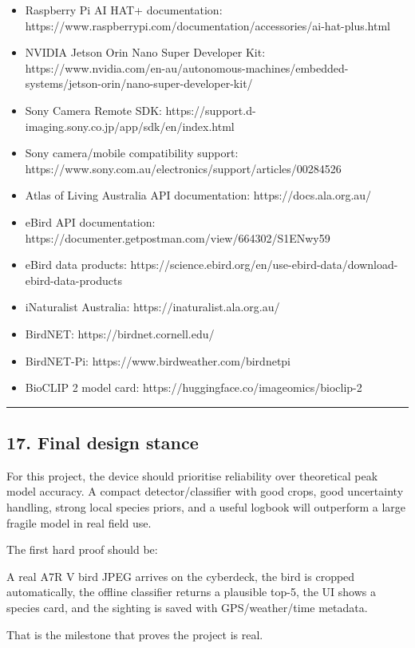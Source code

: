 \documentclass[
  11pt,
]{article}
\newenvironment{Shaded}{}{}
\newcommand{\NormalTok}[1]{#1}
\providecommand{\tightlist}{%
  \setlength{\itemsep}{0pt}\setlength{\parskip}{0pt}}
\begin{document}
\begin{itemize}
\tightlist
\item
  Raspberry Pi AI HAT+ documentation:
  https://www.raspberrypi.com/documentation/accessories/ai-hat-plus.html
\item
  NVIDIA Jetson Orin Nano Super Developer Kit:
  https://www.nvidia.com/en-au/autonomous-machines/embedded-systems/jetson-orin/nano-super-developer-kit/
\item
  Sony Camera Remote SDK:
  https://support.d-imaging.sony.co.jp/app/sdk/en/index.html
\item
  Sony camera/mobile compatibility support:
  https://www.sony.com.au/electronics/support/articles/00284526
\item
  Atlas of Living Australia API documentation: https://docs.ala.org.au/
\item
  eBird API documentation:
  https://documenter.getpostman.com/view/664302/S1ENwy59
\item
  eBird data products:
  https://science.ebird.org/en/use-ebird-data/download-ebird-data-products
\item
  iNaturalist Australia: https://inaturalist.ala.org.au/
\item
  BirdNET: https://birdnet.cornell.edu/
\item
  BirdNET-Pi: https://www.birdweather.com/birdnetpi
\item
  BioCLIP 2 model card: https://huggingface.co/imageomics/bioclip-2
\end{itemize}

\begin{center}\rule{0.5\linewidth}{0.5pt}\end{center}

\subsection{17. Final design stance}\label{final-design-stance}

For this project, the device should prioritise reliability over
theoretical peak model accuracy. A compact detector/classifier with good
crops, good uncertainty handling, strong local species priors, and a
useful logbook will outperform a large fragile model in real field use.

The first hard proof should be:

\begin{Shaded}
\begin{Highlighting}[]
\NormalTok{A real A7R V bird JPEG arrives on the cyberdeck,}
\NormalTok{the bird is cropped automatically,}
\NormalTok{the offline classifier returns a plausible top{-}5,}
\NormalTok{the UI shows a species card,}
\NormalTok{and the sighting is saved with GPS/weather/time metadata.}
\end{Highlighting}
\end{Shaded}

That is the milestone that proves the project is real.
\end{document}
